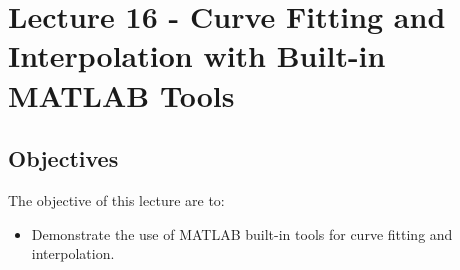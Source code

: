 \chapter{Lecture 16 - Curve Fitting and Interpolation with Built-in MATLAB Tools}
\label{ch:lec16n}
\section{Objectives}
The objective of this lecture are to:
\begin{itemize}
\item Demonstrate the use of MATLAB built-in tools for curve fitting and interpolation.
\end{itemize}
\setcounter{lstannotation}{0}


